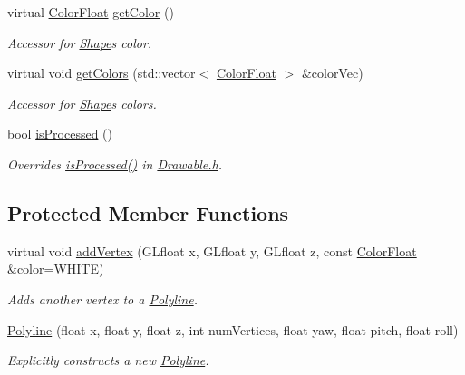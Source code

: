 \begin{DoxyCompactItemize}
virtual \hyperlink{structtsgl_1_1_color_float}{Color\+Float} \hyperlink{classtsgl_1_1_polyline_ad0c19e65e6573ff85adf24c984968618}{get\+Color} ()
\begin{DoxyCompactList}\small\item\em Accessor for \hyperlink{classtsgl_1_1_shape}{Shape}\textquotesingle{}s color. \end{DoxyCompactList}\item 
virtual void \hyperlink{classtsgl_1_1_polyline_aea583be1dd5d812c1684c05c2372be83}{get\+Colors} (std\+::vector$<$ \hyperlink{structtsgl_1_1_color_float}{Color\+Float} $>$ \&color\+Vec)
\begin{DoxyCompactList}\small\item\em Accessor for \hyperlink{classtsgl_1_1_shape}{Shape}\textquotesingle{}s colors. \end{DoxyCompactList}\item 
bool \hyperlink{classtsgl_1_1_polyline_a9ce8dd308664600c31ef0047908c31d5}{is\+Processed} ()
\begin{DoxyCompactList}\small\item\em Overrides \hyperlink{classtsgl_1_1_polyline_a9ce8dd308664600c31ef0047908c31d5}{is\+Processed()} in \hyperlink{_drawable_8h_source}{Drawable.\+h}. \end{DoxyCompactList}\end{DoxyCompactItemize}
\subsection*{Protected Member Functions}
\begin{DoxyCompactItemize}
\item 
virtual void \hyperlink{classtsgl_1_1_polyline_a938427299b0a5ecef0bbc4cf38d5ee1c}{add\+Vertex} (G\+Lfloat x, G\+Lfloat y, G\+Lfloat z, const \hyperlink{structtsgl_1_1_color_float}{Color\+Float} \&color=W\+H\+I\+TE)
\begin{DoxyCompactList}\small\item\em Adds another vertex to a \hyperlink{classtsgl_1_1_polyline}{Polyline}. \end{DoxyCompactList}\item 
\hyperlink{classtsgl_1_1_polyline_a7c55401613659a0fcf207143acc70548}{Polyline} (float x, float y, float z, int num\+Vertices, float yaw, float pitch, float roll)
\begin{DoxyCompactList}\small\item\em Explicitly constructs a new \hyperlink{classtsgl_1_1_polyline}{Polyline}. \end{DoxyCompactList}\end{DoxyCompactItemize}

